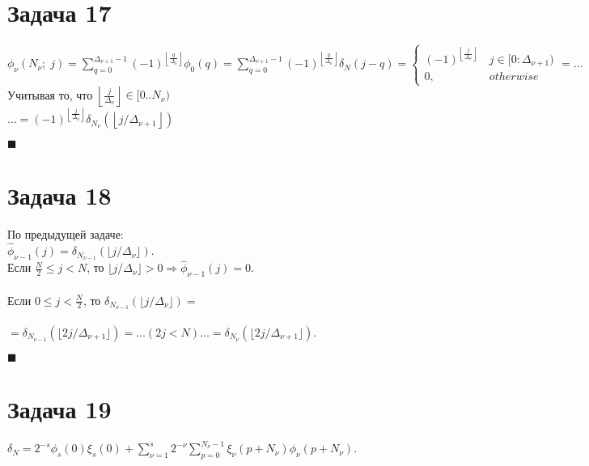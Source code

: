 \documentclass{article}
\title{}
\author{
	Дерюгин Денис, студент 561-й учебной группы
}
\date{\today}
\newcommand\proofend{\begin{flushright}$\blacksquare$\end{flushright}}
\begin{document}
\maketitle
\setcounter{MaxMatrixCols}{20}
\large{
	\section*{Задача 17}

	$\phi_\nu(N_\nu; \;j) = \sum\limits_{q=0}^{\Delta_{\nu+1}-1}(-1)^{\left \lfloor \frac{q}{\Delta_\nu}  \right \rfloor} \phi_0(q) = \sum\limits_{q=0}^{\Delta_{\nu+1}-1}(-1)^{\left \lfloor \frac{q}{\Delta_\nu}  \right \rfloor} \delta_N(j - q) = \left\{\begin{matrix}
		(-1)^{\left \lfloor \frac{j}{\Delta_\nu}  \right \rfloor} \, & j \in [0: \Delta_{\nu + 1})\\
		0, & otherwise
	\end{matrix}\right. = ... $\\
	Учитывая то, что $\left \lfloor \frac{j}{\Delta_\nu}  \right \rfloor \in [0..N_\nu)$\\
	$... = (-1)^{\left \lfloor \frac{j}{\Delta_\nu}  \right \rfloor} \delta_{N_\nu}(\left \lfloor j/\Delta_{\nu + 1}  \right \rfloor)$
	\proofend


	\section*{Задача 18}
	По предыдущей задаче:\\
	$\widehat{\phi}_{\nu - 1}(j) = \delta_{N_{\nu-1}}(\lfloor j / \Delta_\nu \rfloor).$\\
	Если $ \frac{N}{2} \leq j < N$, то $\lfloor j / \Delta_\nu \rfloor > 0 \Rightarrow \widehat{\phi}_{\nu - 1}(j) = 0$. \\ \\
	Если $ 0 \leq j < \frac{N}{2}$, то $\delta_{N_{\nu-1}}(\lfloor j / \Delta_\nu \rfloor) = $\\ \\
	$= \delta_{N_{\nu-1}}(\lfloor 2j / \Delta_{\nu+1} \rfloor) = ... (2j < N) ... = \delta_{N_{\nu}}(\lfloor 2j / \Delta_{\nu+1} \rfloor).$
	\proofend

	\pagebreak

	\section*{Задача 19}
	$\delta_N = 2^{-s} \phi_s(0) \xi_s(0) + \sum\limits_{\nu=1}^{s}2^{-\nu} \sum\limits_{p = 0}^{N_\nu - 1} \xi_\nu(p + N_\nu) \phi_\nu(p + N_\nu)$.\\ \\

}
\end{document}

